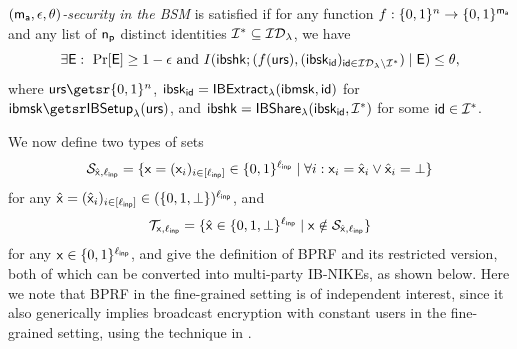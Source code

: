 \begin{definition}
	\emph{$(\mathsf{m_a}, \epsilon, \theta)$-security in the BSM} is satisfied if for any function $f : \{0, 1\}^{n} \rightarrow \{0, 1\}^{\mathsf{m_a}}$ and any list of $\mathsf{n_p}$ distinct identities $\mathcal{I}^* \subseteq \mathcal{ID}_{\lambda}$, we have
	$$\exists \event:\ \Pr[\event]\geq 1-\epsilon\ \mbox{and}\ I(\ibshk;(f(\urs), (\ibsk_{\ibid})_{\ibid \in \mathcal{ID}_{\lambda}\backslash\ibidlist^*})\mid\event)\leq \theta,$$
	where $\urs \getsr \bin^{n}$, $\mathsf{ibsk}_{\mathsf{id}} = \mathsf{IBExtract}_{\lambda}(\allowbreak\mathsf{ibmsk}, \mathsf{id})$ for $\ibmsk \getsr \ibsetup(\urs)$, and $\mathsf{ibshk} = \mathsf{IBShare}_{\lambda}(\mathsf{ibsk}_{\mathsf{id}}, \mathcal{I}^*)$ for some $\mathsf{id} \in \mathcal{I}^*$.
\end{definition}


We now define two types of sets
$$\mathcal{S}_{\hat{\mathsf{x}}, \ell_{\mathsf{inp}}} = \{\mathsf{x} = (\mathsf{x}_i)_{i \in [\ell_{\mathsf{inp}}]} \in \{0, 1\}^{\ell_{\mathsf{inp}}} \mid \forall i : \mathsf{x}_i = \hat{\mathsf{x}}_i \vee \hat{\mathsf{x}}_i = \bot \}$$ for any $\hat{\mathsf{x}} = (\hat{\mathsf{x}}_i)_{i \in [\ell_{\mathsf{inp}}]} \in (\{0,1, \bot\})^{\ell_{\mathsf{inp}}}$, and $$\mathcal{T}_{\mathsf{x}, \ell_{\mathsf{inp}}} = \{\hat{\mathsf{x}} \in \{0,1,\bot\}^{\ell_{\mathsf{inp}}} \mid \mathsf{x} \notin \mathcal{S}_{\hat{\mathsf{x}},\ell_{\mathsf{inp}}} \}$$ for any $\mathsf{x} \in \{0, 1\}^{\ell_{\mathsf{inp}}}$, and give the definition of BPRF and its restricted version, both of which can be converted into multi-party IB-NIKEs, as shown below. Here we note that BPRF in the fine-grained setting is of independent interest, since it also generically implies broadcast encryption with constant users in the fine-grained setting, using the technique in \cite{AC:BonWat13}.

